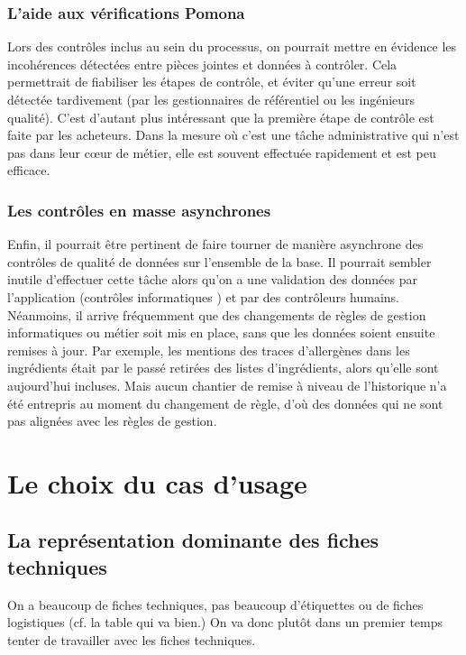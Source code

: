             \subsection{L'aide aux vérifications Pomona}
            Lors des contrôles inclus au sein du processus, on pourrait mettre en évidence les incohérences détectées entre pièces jointes et données à contrôler.
            Cela permettrait de fiabiliser les étapes de contrôle, et éviter qu'une erreur soit détectée tardivement (par les gestionnaires de référentiel ou les ingénieurs qualité).
            C'est d'autant plus intéressant que la première étape de contrôle est faite par les acheteurs.
            Dans la mesure où c'est une tâche administrative qui n'est pas dans leur c{\oe}ur de métier, elle est souvent effectuée rapidement et est peu efficace.

            \subsection{Les contrôles en masse asynchrones}
            Enfin, il pourrait être pertinent de faire tourner de manière asynchrone des contrôles de qualité de données sur l'ensemble de la base.
            Il pourrait sembler inutile d'effectuer cette tâche alors qu'on a une validation des données par l'application (contrôles \og informatiques \fg) et par des contrôleurs humains.
            Néanmoins, il arrive fréquemment que des changements de règles de gestion informatiques ou métier soit mis en place, sans que les données soient ensuite remises à jour.
            Par exemple, les mentions des traces d'allergènes dans les ingrédients était par le passé retirées des listes d'ingrédients, alors qu'elle sont aujourd'hui incluses. 
            Mais aucun chantier de remise à niveau de l'historique n'a été entrepris au moment du changement de règle, d'où des données qui ne sont pas alignées avec les règles de gestion.

    \chapter{Le choix du cas d'usage}

        \section{La représentation dominante des fiches techniques}
        On a beaucoup de fiches techniques, pas beaucoup d'étiquettes ou de fiches logistiques (cf. la table qui va bien.)
        On va donc plutôt dans un premier temps tenter de travailler avec les fiches techniques.

